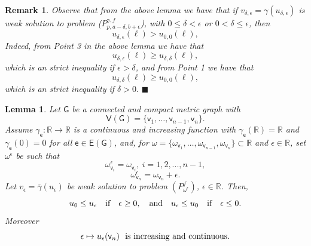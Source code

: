 \documentclass[reqno,12pt]{amsart}
\newtheorem{lemma}[theorem]{Lemma} %
\newtheorem{remark}[theorem]{Remark}
\def\R{\mathbb R} %
\def\e{\mathsf{e}} 	%
\def\v{\mathsf{v}}	%
\newcommand{\G}{\mathsf{G}}	%
\newcommand{\V}{\mathsf{V}}	%
\newcommand{\E}{\mathsf{E}}	%
\numberwithin{equation}{section} %
\begin{document}
\begin{remark}\label{030326_001rem}\rm  
 Observe that from the above lemma we have that if $v_{\delta,\epsilon}=\gamma(u_{\delta,\epsilon})$ is weak solution to problem ($P_{p,a-\delta,b+\epsilon}^{\gamma,f}$),  with $0\le\delta<\epsilon$ or $0<\delta\le\epsilon$,  then
 $$u_{\delta,\epsilon}(\ell)> u_{0,0}(\ell),$$
 Indeed, from Point 3 in the above lemma  we have that
 $$u_{\delta,\epsilon}(\ell)\ge u_{\delta,\delta}(\ell),$$
 which is an strict inequality if $\epsilon>\delta$,
 and from Point 1 we have that
 $$u_{\delta,\delta}(\ell)\ge u_{0,0}(\ell),$$
 which is an strict inequality if $\delta>0.$ 
 \hfill $\blacksquare$
\end{remark}



\begin{lemma}\label{lemma5}  Let  $\G$ be a  connected and compact metric graph with $$\V(\G) = \{ \v_1, \ldots, \v_{n-1},\v_n \}.$$
Assume $\gamma_\e:\mathbb{R}\to \mathbb{R}$ is a  continuous and increasing function with 
$\gamma_\e(\mathbb{R})=\mathbb{R}$ and $\gamma_\e(0)=0$ for all $\e \in \E(\G)$, and, for $\omega=\{\omega_{\v_1}, \ldots, \omega_{\v_{n-1}},\omega_{\v_n}  \} \subset \R$ and $\epsilon\in \R$,  set $\omega^\epsilon$ be such that $$\omega^\epsilon_{\v_i}=\omega_{\v_i}, \ i=1,2,...,n-1,$$ 
$$\omega^\epsilon_{\v_n}=\omega_{\v_n}+\epsilon.$$ 
Let $v_\epsilon = \overline{\gamma}(u_\epsilon)$ be weak solution  to problem $(P_{\omega^\epsilon}^f)$,   $\epsilon\in \mathbb{R}$. 
 Then, 
 $$u_0 \leq u_\epsilon \quad \hbox{if} \quad  \epsilon \ge 0, \quad \hbox{and} \quad  u_\epsilon \leq u_0 \quad \hbox{if} \quad \epsilon \le 0.$$
Moreover
 $$ \epsilon\mapsto u_\epsilon(\v_n) \ \hbox{ is increasing and continuous.}$$ 
\end{lemma}
\end{document}
